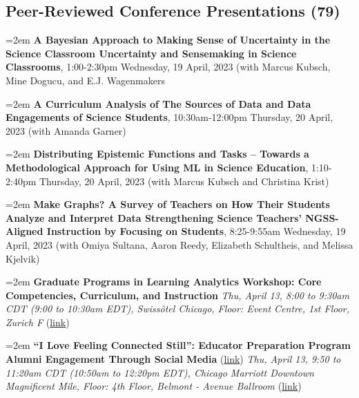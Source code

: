\documentclass[
  14,
]{article}
\begin{document}
\hypertarget{peer-reviewed-conference-presentations-79}{%
\subsection{Peer-Reviewed Conference Presentations
(79)}\label{peer-reviewed-conference-presentations-79}}

\hangindent=2em \textbf{A Bayesian Approach to Making Sense of
Uncertainty in the Science Classroom Uncertainty and Sensemaking in
Science Classrooms}, 1:00-2:30pm Wednesday, 19 April, 2023 (with Marcus
Kubsch, Mine Dogucu, and E.J. Wagenmakers

\hangindent=2em \textbf{A Curriculum Analysis of The Sources of Data and
Data Engagements of Science Students}, 10:30am-12:00pm Thursday, 20
April, 2023 (with Amanda Garner)

\hangindent=2em \textbf{Distributing Epistemic Functions and Tasks --
Towards a Methodological Approach for Using ML in Science Education},
1:10-2:40pm Thursday, 20 April, 2023 (with Marcus Kubsch and Christina
Krist)

\hangindent=2em \textbf{Make Graphs? A Survey of Teachers on How Their
Students Analyze and Interpret Data Strengthening Science Teachers'
NGSS-Aligned Instruction by Focusing on Students}, 8:25-9:55am
Wednesday, 19 April, 2023 (with Omiya Sultana, Aaron Reedy, Elizabeth
Schultheis, and Melissa Kjelvik)

\hangindent=2em \textbf{Graduate Programs in Learning Analytics
Workshop: Core Competencies, Curriculum, and Instruction} \emph{Thu,
April 13, 8:00 to 9:30am CDT (9:00 to 10:30am EDT), Swissôtel Chicago,
Floor: Event Centre, 1st Floor, Zurich F}
(\href{https://convention2.allacademic.com/one/aera/aera23/index.php?cmd=Online+Program+View+Session\&selected_session_id=2011190\&PHPSESSID=ioumtke7pucbovqhj69hl0moa8}{link})

\hangindent=2em \textbf{``I Love Feeling Connected Still'': Educator
Preparation Program Alumni Engagement Through Social Media}
(\href{https://convention2.allacademic.com/one/aera/aera23/index.php?cmd=Online+Program+View+Paper\&selected_paper_id=2011288\&PHPSESSID=ioumtke7pucbovqhj69hl0moa8}{link})
\emph{Thu, April 13, 9:50 to 11:20am CDT (10:50am to 12:20pm EDT),
Chicago Marriott Downtown Magnificent Mile, Floor: 4th Floor, Belmont -
Avenue Ballroom}
(\href{https://convention2.allacademic.com/one/aera/aera23/index.php?cmd=Online+Program+View+Session\&selected_session_id=2041314\&PHPSESSID=ioumtke7pucbovqhj69hl0moa8}{link})
\end{document}
